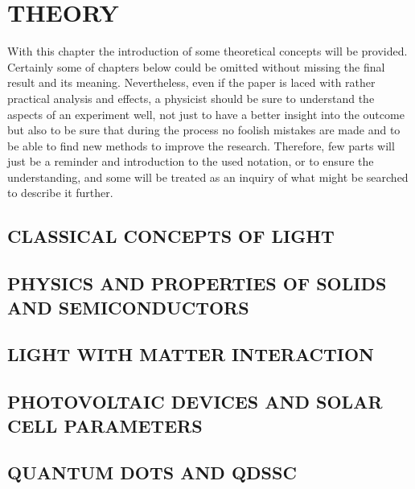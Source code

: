 \chapter{THEORY}

With this chapter the introduction of some theoretical concepts will be provided. Certainly some of chapters below could be omitted without missing the final result and its meaning. Nevertheless, even if the paper is laced with rather practical analysis and effects, a physicist should be sure to understand the aspects of an experiment well, not just to have a better insight into the outcome but also to be sure that during the process no foolish mistakes are made and to be able to find new methods to improve the research. Therefore, few parts will just be a reminder and introduction to the used notation, or to ensure the understanding, and some will be treated as an inquiry of what might be searched to describe it further. 

\section{CLASSICAL CONCEPTS OF LIGHT}

\section{PHYSICS AND PROPERTIES OF SOLIDS AND SEMICONDUCTORS}

\section{LIGHT WITH MATTER INTERACTION}

\section{PHOTOVOLTAIC DEVICES AND SOLAR CELL PARAMETERS}

\section{QUANTUM DOTS AND QDSSC}
